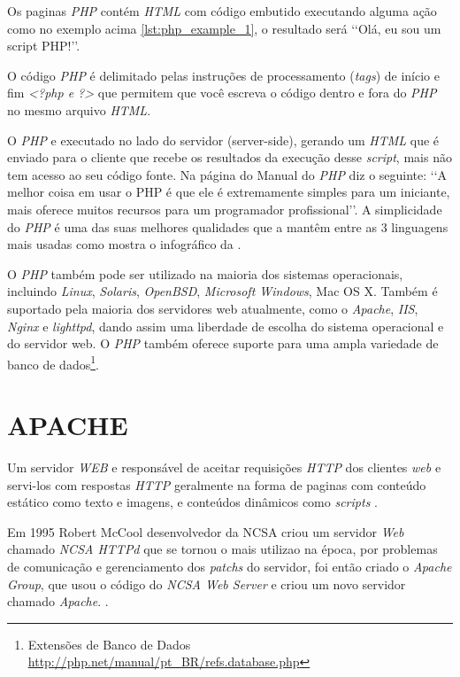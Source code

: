 Os paginas \textit{PHP} contém \textit{HTML} com código embutido executando alguma ação como no exemplo acima \ref{lst:php_example_1}, o resultado será \lq\lq Olá, eu sou um script PHP!\rq\rq.

O código \textit{PHP} é delimitado pelas instruções de processamento (\textit{tags}) de início e fim \textit{<?php e ?>} que permitem que você escreva o código dentro e fora do \textit{PHP} no mesmo arquivo \textit{HTML}. \cite{php-intro}

O \textit{PHP} e executado no lado do servidor (server-side), gerando um \textit{HTML} que é enviado para o cliente que recebe os resultados da execução desse \textit{script}, mais não tem acesso ao seu código fonte. Na página do Manual do \textit{PHP} diz o seguinte: \lq\lq A melhor coisa em usar o PHP é que ele é extremamente simples para um iniciante, mais oferece muitos recursos para um programador profissional\rq\rq {}. A simplicidade do \textit{PHP} é uma das suas melhores qualidades que a mantêm entre as 3 linguagens mais usadas como mostra o infográfico da .

O \textit{PHP} também pode ser utilizado na maioria dos sistemas operacionais, incluindo \textit{Linux}, \textit{Solaris}, \textit{OpenBSD}, \textit{Microsoft Windows}, Mac OS X. Também é suportado pela maioria dos servidores web atualmente, como o \textit{Apache}, \textit{IIS}, \textit{Nginx} e \textit{lighttpd}, dando assim uma liberdade de escolha do sistema operacional e do servidor web. O \textit{PHP} também oferece suporte para uma ampla variedade de banco de dados\footnote{Extensões de Banco de Dados \url{http://php.net/manual/pt_BR/refs.database.php}}.


\section{APACHE}

Um servidor \textit{WEB} e responsável de aceitar requisições \textit{HTTP} dos clientes \textit{web} e servi-los com respostas \textit{HTTP} geralmente na forma de paginas com conteúdo estático como texto e imagens, e conteúdos dinâmicos como \textit{scripts} \cite[p.~15]{igor}.

Em 1995 Robert McCool desenvolvedor da \ac{NCSA} criou um servidor \textit{Web} chamado \textit{NCSA HTTPd} que se tornou o mais utilizao na época, por problemas de comunicação e gerenciamento dos \textit{patchs} do servidor, foi então criado o \textit{Apache Group}, que usou o código do \textit{NCSA Web Server} e criou um novo servidor chamado \textit{Apache}. \cite[p.~36]{kabir}.

